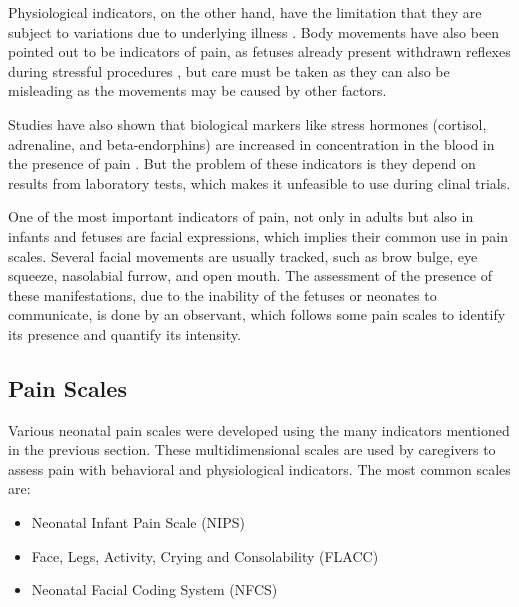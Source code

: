 
Physiological indicators, on the other hand, have the limitation that they are subject to variations due to underlying illness \citep{sweet1998physiological}. Body movements have also been pointed out to be indicators of pain, as fetuses already present withdrawn reflexes during stressful procedures \citep{Zimmermann1991}, but care must be taken as they can also be misleading as the movements may be caused by other factors.

Studies have also shown that biological markers like stress hormones (cortisol, adrenaline, and beta-endorphins) are increased in concentration in the blood in the presence of pain \citep{giannakoulopoulos1994fetal}. But the problem of these indicators is they depend on results from laboratory tests, which makes it unfeasible to use during clinal trials.

One of the most important indicators of pain, not only in adults but also in infants and fetuses are facial expressions, which implies their common use in pain scales. Several facial movements are usually tracked, such as brow bulge, eye squeeze, nasolabial furrow, and open mouth. The assessment of the presence of these manifestations, due to the inability of the fetuses or neonates to communicate, is done by an observant, which follows some pain scales to identify its presence and quantify its intensity. 


\subsection{Pain Scales}

Various neonatal pain scales were developed using the many indicators mentioned in the previous section. These multidimensional scales are used by caregivers to assess pain with behavioral and physiological indicators. The most common scales are:

\begin{itemize}
    \item Neonatal Infant Pain Scale (NIPS)
    \item Face, Legs, Activity, Crying and Consolability (FLACC)
    \item Neonatal Facial Coding System (NFCS)
\end{itemize}

